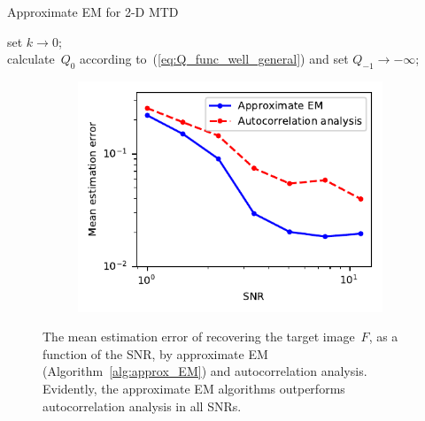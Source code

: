 \documentclass{article}
\begin{document}
\begin{algorithm}[!tb]
  \caption{Approximate EM for \mbox{2-D} MTD}\label{alg:approx_EM}
\BlankLine
set $k \rightarrow 0$;\\
calculate~$Q_{0}$ according to~(\ref{eq:Q_func_well_general}) and set $Q_{-1} \rightarrow -\infty$;\\
\end{algorithm}

\begin{figure}[!tb]
	\begin{subfigure}[ht]{\columnwidth}
		\centering
		\includegraphics[width=0.75\columnwidth]{figures/experiment_SNR_err.pdf}
	\end{subfigure}
	\caption{The mean estimation error of recovering the target image~$F$, as a function of the SNR, by approximate EM (Algorithm~\ref{alg:approx_EM}) and autocorrelation analysis. Evidently, the approximate EM algorithms outperforms autocorrelation analysis in all SNRs.}
\label{fig:noise_experiment}
\end{figure}
\end{document}
